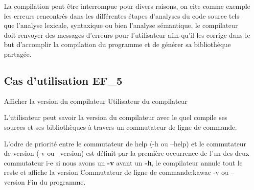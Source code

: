 {                                                %
 
}{} %
{La compilation peut être interrompue pour divers raisons, on cite comme exemple  les erreurs rencontrés dans les différentes étapes d'analyses du code source  tels que l'analyse lexicale, syntaxique ou bien l'analyse sémantique, le compilateur doit renvoyer des messages d'erreurs pour l'utilisateur afin qu'il les corrige dans le but d'accomplir la compilation du programme et de générer sa bibliothèque partagée.} %
\subsection{Cas d'utilisation EF\_5}
\fiche
{Afficher la version du compilateur}                      %
{Utilisateur du compilateur}                               %
{                                                %
   
L'utilisateur peut savoir la version du compilateur avec le quel compile ses sources et ses bibliothèques  à travers un commutateur de ligne de commande.   
}
{
   L'odre de priorité entre le commutateur de help (-h ou --help) et le commutateur de version (-v ou --version) est définit par la première occurrence de l'un des deux commutateur i-e si nous avons un \textbf {-v} avant un \textbf {-h}, le compilateur annule tout le reste et affiche la version
}                                                %
{Commutateur de ligne de commande:kawac -v ou --version}                             %
{Fin du programme.}                       %
{                                                %
 
}{} %
{} %
